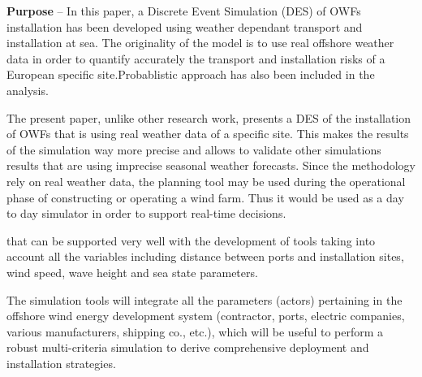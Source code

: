 \textbf{Purpose} --
In this paper, a Discrete Event Simulation (DES) of OWFs installation has been developed using weather dependant transport and installation at sea. The originality of the model is to use real offshore weather data in order to quantify accurately the transport and installation risks of a European specific site.Probablistic approach has also been included in the analysis.


The present paper, unlike other research work, presents a DES of the installation of OWFs that is using real weather data of a specific site. This makes the results of the simulation way more precise and allows to validate other simulations results that are using imprecise seasonal weather forecasts. Since the methodology rely on real weather data, the planning tool may be used during the operational phase of constructing or operating a wind farm. Thus it would be used as a day to day simulator in order to support real-time decisions.

 that can be supported very well with the development of tools taking into account all the variables including distance between ports and installation sites, wind speed, wave height and sea state parameters.

The simulation tools will integrate all the parameters (actors) pertaining in the offshore wind energy development system (contractor, ports, electric companies, various manufacturers, shipping co., etc.), which will be useful to perform a robust multi-criteria simulation to derive comprehensive deployment and installation strategies.

 